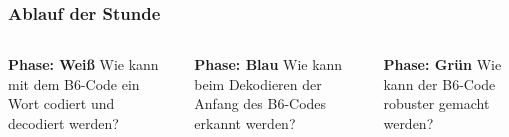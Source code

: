 \documentclass{beamer}
\begin{document}
\begin{frame}[t]
	\frametitle{Ablauf der Stunde}

	\begin{columns}[t]
		\begin{column}{0.3\textwidth}
			\centering
			\textbf{Phase: Weiß }
			Wie kann mit dem B6-Code ein Wort codiert und decodiert werden?
		\end{column}
		\begin{column}{0.3\textwidth}
			\centering
			\textbf{Phase: Blau }
			Wie kann beim Dekodieren der Anfang des B6-Codes erkannt werden?
		\end{column}
		\begin{column}{0.3\textwidth}
			\centering
			\textbf{Phase: Grün }
			Wie kann der B6-Code robuster gemacht werden?
		\end{column}
	\end{columns}


\end{frame}
\end{document}
